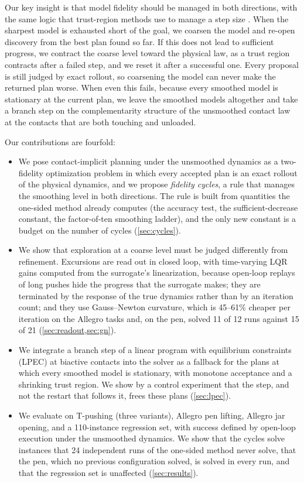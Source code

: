 \documentclass[11pt]{article}
\theoremstyle{remark}
\begin{document}
Our key insight is that model fidelity should be managed in both directions, with the same logic that trust-region methods use to manage a step size \cite{conn2000trust,alexandrov1998trust}. When the sharpest model is exhausted short of the goal, we coarsen the model and re-open discovery from the best plan found so far. If this does not lead to sufficient progress, we contract the coarse level toward the physical law, as a trust region contracts after a failed step, and we reset it after a successful one. Every proposal is still judged by exact rollout, so coarsening the model can never make the returned plan worse. When even this fails, because every smoothed model is stationary at the current plan, we leave the smoothed models altogether and take a branch step on the complementarity structure of the unsmoothed contact law at the contacts that are both touching and unloaded.

Our contributions are fourfold:
\begin{itemize}[leftmargin=*]
\item We pose contact-implicit planning under the unsmoothed dynamics as a two-fidelity optimization problem in which every accepted plan is an exact rollout of the physical dynamics, and we propose \emph{fidelity cycles}, a rule that manages the smoothing level in both directions. The rule is built from quantities the one-sided method already computes (the accuracy test, the sufficient-decrease constant, the factor-of-ten smoothing ladder), and the only new constant is a budget on the number of cycles (\cref{sec:cycles}).
\item We show that exploration at a coarse level must be judged differently from refinement. Excursions are read out in closed loop, with time-varying LQR gains computed from the surrogate's linearization, because open-loop replays of long pushes hide the progress that the surrogate makes; they are terminated by the response of the true dynamics rather than by an iteration count; and they use Gauss--Newton curvature, which is 45--61\% cheaper per iteration on the Allegro tasks and, on the pen, solved 11 of 12 runs against 15 of 21 (\cref{sec:readout,sec:gn}).
\item We integrate a branch step of a linear program with equilibrium constraints (LPEC) at biactive contacts into the solver as a fallback for the plans at which every smoothed model is stationary, with monotone acceptance and a shrinking trust region. We show by a control experiment that the step, and not the restart that follows it, frees these plans (\cref{sec:lpec}).
\item We evaluate on T-pushing (three variants), Allegro pen lifting, Allegro jar opening, and a 110-instance regression set, with success defined by open-loop execution under the unsmoothed dynamics. We show that the cycles solve instances that 24 independent runs of the one-sided method never solve, that the pen, which no previous configuration solved, is solved in every run, and that the regression set is unaffected (\cref{sec:results}).
\end{itemize}
\end{document}
